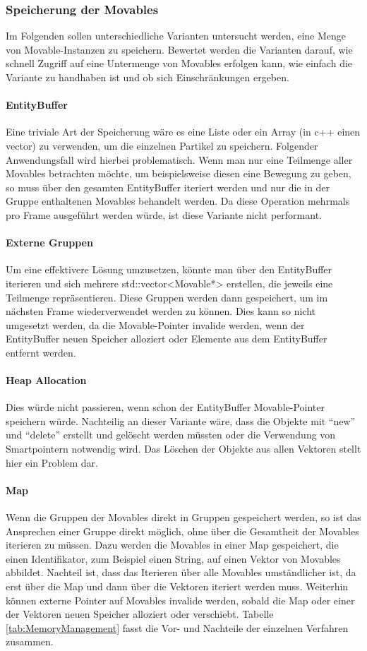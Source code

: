 \documentclass[11pt,a4paper]{article}
\begin{document}
\subsubsection{Speicherung der Movables}
Im Folgenden sollen unterschiedliche Varianten untersucht werden, eine Menge von Movable-Instanzen zu speichern. Bewertet werden die Varianten darauf, wie schnell Zugriff auf eine Untermenge von Movables erfolgen kann, wie einfach die Variante zu handhaben ist und ob sich Einschränkungen ergeben.
\paragraph{EntityBuffer}
Eine triviale Art der Speicherung wäre es eine Liste oder ein Array (in c++ einen vector) zu verwenden, um die einzelnen Partikel zu speichern. Folgender Anwendungsfall wird hierbei problematisch. Wenn man nur eine Teilmenge aller Movables betrachten möchte, um beispielsweise diesen eine Bewegung zu geben, so muss über den gesamten EntityBuffer iteriert werden und nur die in der Gruppe enthaltenen Movables behandelt werden. Da diese Operation mehrmals pro Frame ausgeführt werden würde, ist diese Variante nicht performant.
\paragraph{Externe Gruppen}
Um eine effektivere Lösung umzusetzen, könnte man über den EntityBuffer iterieren und sich mehrere std::vector<Movable*> erstellen, die jeweils eine Teilmenge repräsentieren. Diese Gruppen werden dann gespeichert, um im nächsten Frame wiederverwendet werden zu können. Dies kann so nicht umgesetzt werden, da die Movable-Pointer invalide werden, wenn der EntityBuffer neuen Speicher alloziert oder Elemente aus dem EntityBuffer entfernt werden.
\paragraph{Heap Allocation}
Dies würde nicht passieren, wenn schon der EntityBuffer Movable-Pointer speichern würde. Nachteilig an dieser Variante wäre, dass die Objekte mit ``new'' und ``delete'' erstellt und gelöscht werden müssten oder die Verwendung von Smartpointern notwendig wird. Das Löschen der Objekte aus allen Vektoren stellt hier ein Problem dar.
\paragraph{Map}
Wenn die Gruppen der Movables direkt in Gruppen gespeichert werden, so ist das Ansprechen einer Gruppe direkt möglich, ohne über die Gesamtheit der Movables iterieren zu müssen. Dazu werden die Movables in einer Map gespeichert, die einen Identifikator, zum Beispiel einen String, auf einen Vektor von Movables abbildet. Nachteil ist, dass das Iterieren über alle Movables umständlicher ist, da erst über die Map und dann über die Vektoren iteriert werden muss. Weiterhin können externe Pointer auf Movables invalide werden, sobald die Map oder einer der Vektoren neuen Speicher alloziert oder verschiebt. Tabelle \ref{tab:MemoryManagement} fasst die Vor- und Nachteile der einzelnen Verfahren zusammen.
\end{document}
